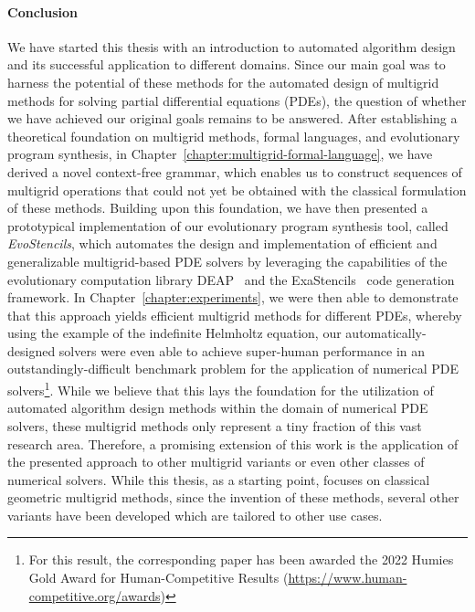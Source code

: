 \paragraph{Conclusion}
We have started this thesis with an introduction to automated algorithm design and its successful application to different domains.
Since our main goal was to harness the potential of these methods for the automated design of multigrid methods for solving partial differential equations (PDEs), the question of whether we have achieved our original goals remains to be answered.
After establishing a theoretical foundation on multigrid methods, formal languages, and evolutionary program synthesis, in Chapter~\ref{chapter:multigrid-formal-language}, we have derived a novel context-free grammar, which enables us to construct sequences of multigrid operations that could not yet be obtained with the classical formulation of these methods.
Building upon this foundation, we have then presented a prototypical implementation of our evolutionary program synthesis tool, called \emph{EvoStencils}, which automates the design and implementation of efficient and generalizable multigrid-based PDE solvers by leveraging the capabilities of the evolutionary computation library DEAP~\cite{rainville2012deap} and the ExaStencils~\cite{lengauer2020exastencils} code generation framework.
In Chapter~\ref{chapter:experiments}, we were then able to demonstrate that this approach yields efficient multigrid methods for different PDEs, whereby using the example of the indefinite Helmholtz equation, our automatically-designed solvers were even able to achieve super-human performance in an outstandingly-difficult benchmark problem for the application of numerical PDE solvers\footnote{For this result, the corresponding paper has been awarded the 2022 Humies Gold Award for Human-Competitive Results (\url{https://www.human-competitive.org/awards})}.
While we believe that this lays the foundation for the utilization of automated algorithm design methods within the domain of numerical PDE solvers, these multigrid methods only represent a tiny fraction of this vast research area.
Therefore, a promising extension of this work is the application of the presented approach to other multigrid variants or even other classes of numerical solvers.
While this thesis, as a starting point, focuses on classical geometric multigrid methods, since the invention of these methods, several other variants have been developed which are tailored to other use cases.
